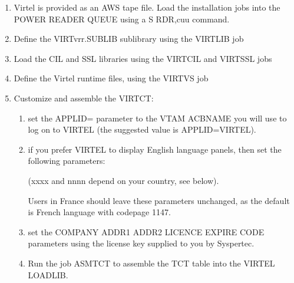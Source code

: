 \documentclass[letterpaper,10pt,english]{sphinxmanual}
\begin{document}
\label{\detokenize{Getting_Started:z-vse}}\begin{enumerate}
%
\item {} 
Virtel is provided as an AWS tape file. Load the installation jobs into the POWER READER QUEUE using a S RDR,cuu command.

\item {} 
Define the VIRTvrr.SUBLIB sublibrary using the VIRTLIB job

\item {} 
Load the CIL and SSL libraries using the VIRTCIL and VIRTSSL jobs

\item {} 
Define the Virtel runtime files, using the VIRTVS job

\item {} 
Customize and assemble the VIRTCT:
\begin{enumerate}
%
\item {} 
set the APPLID= parameter to the VTAM ACBNAME you will use to log on to VIRTEL (the suggested value is APPLID=VIRTEL).

\item {} 
if you prefer VIRTEL to display English language panels, then set the following parameters:

\begin{sphinxVerbatim}[commandchars=\\\{\}]
                                               
                                           
                                        
\end{sphinxVerbatim}

(xxxx and nnnn depend on your country, see below).

Users in France should leave these parameters unchanged, as the default is French language with codepage 1147.

\item {} 
set the COMPANY ADDR1 ADDR2 LICENCE EXPIRE CODE parameters using the license key supplied to you by Syspertec.

\item {} 
Run the job ASMTCT  to assemble the TCT table into the VIRTEL LOADLIB.

\end{enumerate}


\end{enumerate}
\end{document}
